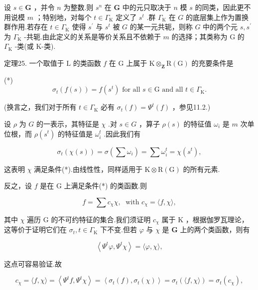 \documentclass[10pt]{article}
\begin{document}
设 \(s \in  \mathbf{G}\) ，并令 \(n\) 为整数.则 \({s}^{n}\) 在 \(\mathbf{G}\) 中的元只取决于 \(n\) 模 \(s\) 的同类，因此更不用说模 \(m\) ；特别地，对每个 \(t \in  {\Gamma }_{\mathrm{K}}\) 定义了 \({s}^{t}\) .群 \({\Gamma }_{\mathrm{K}}\) 在 \(G\) 的底层集上作为置换群作用.若存在 \(t \in  {\Gamma }_{\mathrm{K}}\) 使得 \({s}^{\prime }\) 与 \({s}^{t}\) 被 \(G\) 的某一元共轭，则称 \(G\) 中的两个元 \(s,{s}^{\prime }\) 为 \({\Gamma }_{\mathrm{K}}\) -共轭.由此定义的关系是等价关系且不依赖于 \(m\) 的选择；其类称为 G 的 \({\Gamma }_{\mathrm{K}}\) -类(或 K-类).

定理25. 一个取值于 \(\mathrm{L}\) 的类函数 \(f\) 在 \(\mathrm{G}\) 上属于 \(\mathrm{K}{ \otimes  }_{\mathbf{Z}}\mathrm{R}\left( \mathrm{G}\right)\) 的充要条件是

(*)
\[
{\sigma }_{t}\left( {f\left( s\right) }\right)  = f\left( {s}^{t}\right) \text{ for all }s \in  \mathrm{G}\text{ and all }t \in  {\Gamma }_{\mathrm{K}}.
\]

(换言之，我们对于所有 \(t \in  {\Gamma }_{\mathrm{K}}\) 必有 \({\sigma }_{t}\left( f\right)  = {\Psi }^{t}\left( f\right)\) ，参见11.2.)

设 \(\rho\) 为 \(G\) 的一表示，其特征是 \(\chi\) .对 \(s \in  G\) ，算子 \(\rho \left( s\right)\) 的特征值 \({\omega }_{i}\) 是 \(m\) 次单位根，而 \(\rho \left( {s}^{t}\right)\) 的特征值是 \({\omega }_{i}^{t}\) .因此我们有

\[
{\sigma }_{t}\left( {\chi \left( s\right) }\right)  = \sigma \left( {\sum {\omega }_{i}}\right)  = \sum {\omega }_{i}^{t} = \chi \left( {s}^{t}\right) ,
\]

这表明 \(\chi\) 满足条件(*).由线性性，同样适用于 \(\mathrm{K} \otimes  \mathrm{R}\left( \mathrm{G}\right)\) 的所有元素.

反之，设 \(f\) 是在 \(\mathrm{G}\) 上满足条件(*) 的类函数.则

\[
f = \sum {c}_{\chi }\chi ,\;\text{ with }{c}_{\chi } = \langle f,\chi \rangle ,
\]

其中 \(\chi\) 遍历 G 的不可约特征的集合.我们须证明 \({c}_{\chi }\) 属于 \(\mathrm{K}\) ，根据伽罗瓦理论，这等价于证明它们在 \({\sigma }_{t},t \in  {\Gamma }_{\mathrm{K}}\) 下不变.但若 \(\varphi\) 与 \(\chi\) 是 \(\mathbf{G}\) 上的两个类函数，则有

\[
\left\langle  {{\Psi }^{t}\varphi ,{\Psi }^{t}\chi }\right\rangle   = \langle \varphi ,\chi \rangle ,
\]

这点可容易验证.故

\[
{c}_{\chi } = \langle f,\chi \rangle  = \left\langle  {{\Psi }^{t}f,{\Psi }^{t}\chi }\right\rangle   = \left\langle  {{\sigma }_{t}\left( f\right) ,{\sigma }_{t}\left( \chi \right) }\right\rangle   = {\sigma }_{t}\left( {\langle f,\chi \rangle }\right)  = {\sigma }_{t}\left( {c}_{\chi }\right) ,
\]
\end{document}
